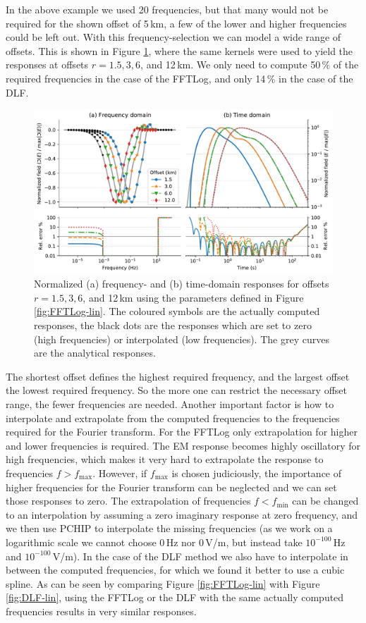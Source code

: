 \documentclass[extra, camera,%
    onecolumn,   %
    referee,     %
]{gji}
\newlength{\fwidth}
\begin{document}
%
In the above example we used 20 frequencies, but that many would not be
required for the shown offset of 5\,km, a few of the lower and higher
frequencies could be left out. With this frequency-selection
we can model a wide range of offsets. This is shown in Figure
\ref{fig:multi-offset}, where the same kernels were used to yield the responses
at offsets $r=1.5,3,6$, and 12\,km. We only need to compute 50\,\% of the
required frequencies in the case of the FFTLog, and only 14\,\% in the case of
the DLF.
%
\begin{figure}
  \centering
  \includegraphics[width=0.75\fwidth]{03-multi-offset}
  \caption{Normalized (a) frequency- and (b) time-domain responses for offsets
    $r=1.5,3,6$, and 12\,km using the parameters defined in Figure
    \ref{fig:FFTLog-lin}. The coloured symbols are the actually computed
    responses, the black dots are the responses which are set to zero (high
    frequencies) or interpolated (low frequencies). The grey curves are the
    analytical responses.}
  \label{fig:multi-offset}
\end{figure}
%

The shortest offset defines the highest required frequency, and the largest
offset the lowest required frequency. So the more one can restrict the
necessary offset range, the fewer frequencies are needed. Another important
factor is how to interpolate and extrapolate from the computed frequencies to
the frequencies required for the Fourier transform. For the FFTLog only
extrapolation for higher and lower frequencies is required. The EM response
becomes highly oscillatory for high frequencies, which makes it very hard to
extrapolate the response to frequencies $f>f_\mathrm{max}$. However, if
$f_\mathrm{max}$ is chosen judiciously, the importance of higher frequencies
for the Fourier transform can be neglected and we can set those responses to
zero. The extrapolation of frequencies $f<f_\mathrm{min}$ can be changed to an
interpolation by assuming a zero imaginary response at zero frequency, and we
then use PCHIP to interpolate the missing frequencies (as we work on a
logarithmic scale we cannot choose 0\,Hz nor 0\,V/m, but instead take
$10^{-100}$\,Hz and $10^{-100}$\,V/m). In the case of the DLF method we also
have to interpolate in between the computed frequencies, for which we found it
better to use a cubic spline. As can be seen by comparing Figure
\ref{fig:FFTLog-lin} with Figure \ref{fig:DLF-lin}, using the FFTLog or
the DLF with the same actually computed frequencies results in very similar
responses.
\end{document}
